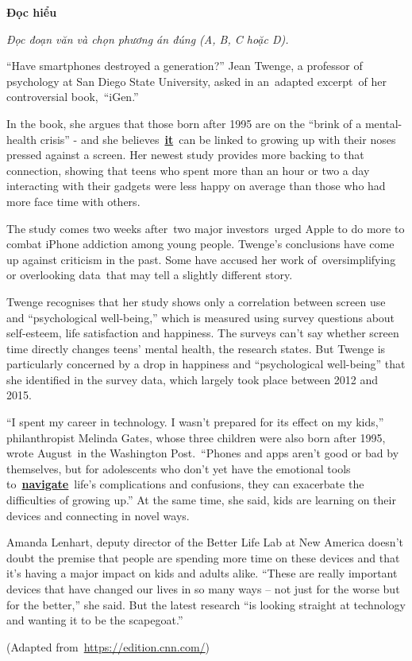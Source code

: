 \documentclass[12pt,a4paper,twoside]{article}
\newenvironment{readingpassage}[1][]{%
    \begin{tcolorbox}[enhanced, colback=grayLight, colframe=secondaryBlue,
        coltitle=textDark, fonttitle=\bfseries, title={#1},
        rounded corners, arc=3mm, boxrule=1pt,
        left=15pt, right=15pt, top=10pt, bottom=10pt,
        breakable, before skip=10pt, after skip=10pt, drop fuzzy shadow]
    \setstretch{1.3}
}{\end{tcolorbox}}
\begin{document}
\begin{groupbox}\textbf{\large Đọc hiểu}\end{groupbox}
\textit{Đọc đoạn văn và chọn phương án đúng (A, B, C hoặc D).}
\begin{readingpassage}[]
“Have smartphones destroyed a generation?” Jean Twenge, a professor of psychology at San Diego State University, asked in an adapted excerpt of her controversial book, “iGen.”

In the book, she argues that those born after 1995 are on the “brink of a mental-health crisis” - and she believes \underline{\textbf{it}} can be linked to growing up with their noses pressed against a screen. Her newest study provides more backing to that connection, showing that teens who spent more than an hour or two a day interacting with their gadgets were less happy on average than those who had more face time with others.

The study comes two weeks after two major investors urged Apple to do more to combat iPhone addiction among young people. Twenge’s conclusions have come up against criticism in the past. Some have accused her work of oversimplifying or overlooking data that may tell a slightly different story.

Twenge recognises that her study shows only a correlation between screen use and “psychological well-being,” which is measured using survey questions about self-esteem, life satisfaction and happiness. The surveys can’t say whether screen time directly changes teens’ mental health, the research states. But Twenge is particularly concerned by a drop in happiness and “psychological well-being” that she identified in the survey data, which largely took place between 2012 and 2015.

“I spent my career in technology. I wasn’t prepared for its effect on my kids,” philanthropist Melinda Gates, whose three children were also born after 1995, wrote August in the Washington Post. “Phones and apps aren’t good or bad by themselves, but for adolescents who don’t yet have the emotional tools to \underline{\textbf{navigate}} life’s complications and confusions, they can exacerbate the difficulties of growing up.” At the same time, she said, kids are learning on their devices and connecting in novel ways.

Amanda Lenhart, deputy director of the Better Life Lab at New America doesn’t doubt the premise that people are spending more time on these devices and that it’s having a major impact on kids and adults alike. “These are really important devices that have changed our lives in so many ways – not just for the worse but for the better,” she said. But the latest research “is looking straight at technology and wanting it to be the scapegoat.”

(Adapted from \underline{https://edition.cnn.com/})
\end{readingpassage}
\end{document}
